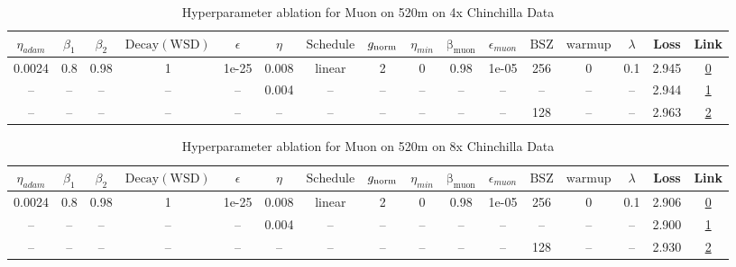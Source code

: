 \begin{table}[H]
\centering
\caption{Hyperparameter ablation for Muon on 520m on 4x Chinchilla Data}
\label{tab:ablation_muon_520m_on_4x_chinchilla_data}
\begin{tabular}{cccccccccccccccc}
\toprule
$\eta_{adam}$ & $\beta_1$ & $\beta_2$ & $\mathrm{Decay (WSD)}$ & $\epsilon$ & $\eta$ & $\mathrm{Schedule}$ & $g_{\mathrm{norm}}$ & $\eta_{min}$ & $\mathrm{\beta_{muon}}$ & $\epsilon_{muon}$ & $\mathrm{BSZ}$ & $\mathrm{warmup}$ & $\lambda$ & Loss & Link \\
\midrule
0.0024 & 0.8 & 0.98 & 1 & 1e-25 & 0.008 & linear & 2 & 0 & 0.98 & 1e-05 & 256 & 0 & 0.1 & 2.945 & \href{https://wandb.ai/marin-community/optimizer-scaling/runs/sweep-520m-42B-muon92eab1lr0.008-wd0.1-minlr0-warmup0-b10.8-b20.-f2fd04}{0} \\
\midrule
-- & -- & -- & -- & -- & 0.004 & -- & -- & -- & -- & -- & -- & -- & -- & 2.944 & \href{https://wandb.ai/marin-community/optimizer-scaling/runs/sweep-520m-42B-muonrde8a35lr0.004-wd0.1-minlr0-warmup0-b10.8-b20-0393ec}{1} \\
-- & -- & -- & -- & -- & -- & -- & -- & -- & -- & -- & 128 & -- & -- & 2.963 & \href{https://wandb.ai/marin-community/optimizer-scaling/runs/sweep-520m-42B-muonc58c06lr0.008-wd0.1-minlr0-warmup0-b10.8-b20.-dfd7f2}{2} \\
\bottomrule
\end{tabular}
\end{table}

\begin{table}[H]
\centering
\caption{Hyperparameter ablation for Muon on 520m on 8x Chinchilla Data}
\label{tab:ablation_muon_520m_on_8x_chinchilla_data}
\begin{tabular}{cccccccccccccccc}
\toprule
$\eta_{adam}$ & $\beta_1$ & $\beta_2$ & $\mathrm{Decay (WSD)}$ & $\epsilon$ & $\eta$ & $\mathrm{Schedule}$ & $g_{\mathrm{norm}}$ & $\eta_{min}$ & $\mathrm{\beta_{muon}}$ & $\epsilon_{muon}$ & $\mathrm{BSZ}$ & $\mathrm{warmup}$ & $\lambda$ & Loss & Link \\
\midrule
0.0024 & 0.8 & 0.98 & 1 & 1e-25 & 0.008 & linear & 2 & 0 & 0.98 & 1e-05 & 256 & 0 & 0.1 & 2.906 & \href{https://wandb.ai/marin-community/optimizer-scaling/runs/sweep-520m-85B-muongc58c06lr0.008-wd0.1-minlr0-warmup0-b10.8-b20-498482}{0} \\
\midrule
-- & -- & -- & -- & -- & 0.004 & -- & -- & -- & -- & -- & -- & -- & -- & 2.900 & \href{https://wandb.ai/marin-community/optimizer-scaling/runs/sweep-520m-85B-muong0ea950lr0.004-wd0.1-minlr0-warmup0-b10.8-b20-9ac240}{1} \\
-- & -- & -- & -- & -- & -- & -- & -- & -- & -- & -- & 128 & -- & -- & 2.930 & \href{https://wandb.ai/marin-community/optimizer-scaling/runs/sweep-520m-85B-muong1d8a02lr0.008-wd0.1-minlr0-warmup0-b10.8-b20-913852}{2} \\
\bottomrule
\end{tabular}
\end{table}


